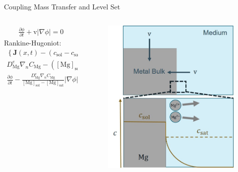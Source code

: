 \documentclass[11pt,t]{beamer}
\begin{document}
\begin{frame}[fragile]{Coupling Mass Transfer and Level Set}

	\begin{columns}[t]
		\begin{column}{.6\textwidth}
		\vspace{-0.7cm}
		\begin{gather*}
		\frac{\partial \phi}{\partial t}+\mathrm{v}|\nabla \phi|=0
		\end{gather*}
Rankine-Hugoniot:
		\begin{gather*}
		\left\{\mathbf{J}(x, t)-\left(c_{\mathrm{sol}}-c_{\mathrm{sat}}\right) \mathrm{v}(x, t)\right\} \cdot n=0
		\end{gather*}
		\begin{gather*}
		D_{\mathrm{Mg}}^{e} \nabla_{n} C_\mathrm{Mg}-\left([\mathrm{Mg}]_{\mathrm{sol}}-[\mathrm{Mg}]_{\mathrm{sat}}\right) \mathrm{v}=0
		\end{gather*}		
		\begin{gather*}
\frac{\partial \phi}{\partial t}-\frac{D_{\mathrm{Mg}}^{e} \nabla_{n} C_\mathrm{Mg}}{[\mathrm{Mg}]_{\mathrm{sol}}-[\mathrm{Mg}]_{\mathrm{sat}}}|\nabla \phi|=0
		\end{gather*}		
		
		
		
		\end{column}
		\begin{column}{.4\textwidth}
			\vspace{-0.8cm}
			\begin{figure}
			\centering
			\includegraphics[width=\textwidth]{rankine}
			 
			\end{figure}
		\end{column}
	\end{columns}

\end{frame}
\end{document}
